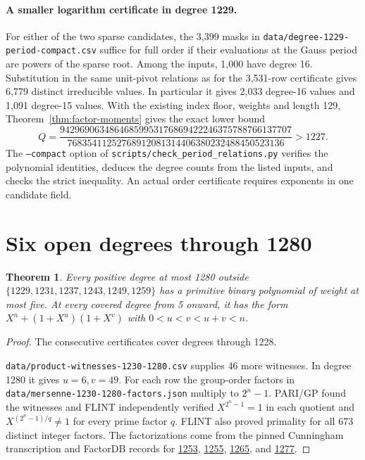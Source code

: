 \documentclass[11pt]{article}
\newtheorem{theorem}{Theorem}
\begin{document}
\paragraph{A smaller logarithm certificate in degree 1229.}
For either of the two sparse candidates, the 3,399 masks in
\nolinkurl{data/degree-1229-period-compact.csv} suffice for full order
if their evaluations at the Gauss period are powers of the sparse root.
Among the inputs, 1,000 have degree 16. Substitution in the same
unit-pivot relations as for the 3,531-row certificate gives
6,779 distinct irreducible values. In particular it gives 2,033
degree-16 values and 1,091 degree-15 values. With the existing
index floor, weights and length 129, Theorem~\ref{thm:factor-moments}
gives the exact lower bound
\[
 Q=\frac{94296906348646859953176869422246375788766137707}
          {76835411252768912081314406380232488450523136}>1227.
\]
The \texttt{--compact} option of \nolinkurl{scripts/check_period_relations.py}
verifies the polynomial identities, deduces the degree counts from the
listed inputs, and checks the strict inequality. An actual order
certificate requires exponents in one candidate field.

\section{Six open degrees through 1280}
\begin{theorem}\label{thm:1280-coverage}
Every positive degree at most 1280 outside
\(\{1229,1231,1237,1243,1249,1259\}\) has a primitive binary polynomial
of weight at most five. At every covered degree from 5 onward, it has
the form \(X^n+(1+X^u)(1+X^v)\) with \(0<u<v<u+v<n\).
\end{theorem}
\begin{proof}
The consecutive certificates cover degrees through 1228.

\nolinkurl{data/product-witnesses-1230-1280.csv} supplies 46 more witnesses. In degree 1280 it gives \(u=6,v=49\).
For each row the group-order factors in
\nolinkurl{data/mersenne-1230-1280-factors.json} multiply to \(2^n-1\).
PARI/GP found the witnesses and FLINT independently verified
\(X^{2^n-1}=1\) in each quotient and
\(X^{(2^n-1)/q}\ne1\) for every prime factor \(q\).
FLINT also proved primality for all 673 distinct integer factors.
The factorizations come from the pinned Cunningham transcription
and FactorDB records for
\href{https://factordb.com/index.php?id=1000000000000001253}{1253},
\href{https://factordb.com/index.php?id=1000000000000001255}{1255},
\href{https://factordb.com/index.php?id=1000000000000001265}{1265}, and
\href{https://factordb.com/index.php?id=1000000000000001277}{1277}.
\end{proof}
\end{document}
